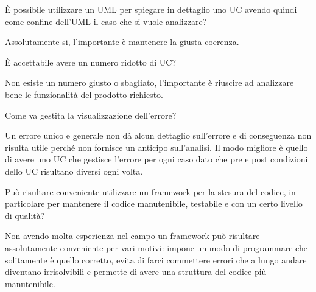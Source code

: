 \begin{itemize}
  \begin{spacing}{3}
  \end{spacing}

  \begin{minipage}[c]{0.47\textwidth}
    \centering
    È possibile utilizzare un UML per spiegare in dettaglio uno UC avendo quindi come confine dell'UML il caso che si vuole analizzare?
  \end{minipage}
  \hfill
  \begin{minipage}[c]{0.47\textwidth}
    \centering
    Assolutamente si, l'importante è mantenere la giusta coerenza.
  \end{minipage}

  \begin{spacing}{3}
  \end{spacing}

  \begin{minipage}[c]{0.47\textwidth}
    \centering
    È accettabile avere un numero ridotto di UC?
  \end{minipage}
  \hfill
  \begin{minipage}[c]{0.47\textwidth}
    \centering
    Non esiste un numero giusto o sbagliato, l'importante è riuscire ad analizzare bene le funzionalità del prodotto richiesto.
  \end{minipage}

  \begin{spacing}{3}
  \end{spacing}

  \begin{minipage}[c]{0.47\textwidth}
    \centering
    Come va gestita la visualizzazione dell'errore?
  \end{minipage}
  \hfill
  \begin{minipage}[c]{0.47\textwidth}
    \centering
    Un errore unico e generale non dà alcun dettaglio sull'errore e di conseguenza non risulta utile perché non fornisce un anticipo sull'analisi. Il modo migliore è quello di avere uno UC che gestisce l'errore per ogni caso dato che pre e post condizioni dello UC risultano diversi ogni volta.
  \end{minipage}

  \begin{spacing}{3}
  \end{spacing}

  \begin{minipage}[c]{0.47\textwidth}
    \centering
    Può risultare conveniente utilizzare un framework per la stesura del codice, in particolare per mantenere il codice manutenibile, testabile e con un certo livello di qualità?
  \end{minipage}
  \hfill
  \begin{minipage}[c]{0.47\textwidth}
    \centering
    Non avendo molta esperienza nel campo un framework può risultare assolutamente conveniente per vari motivi: impone un modo di programmare che solitamente è quello corretto, evita di farci commettere errori che a lungo andare diventano irrisolvibili e permette di avere una struttura del codice più manutenibile.
  \end{minipage}


\end{itemize}
